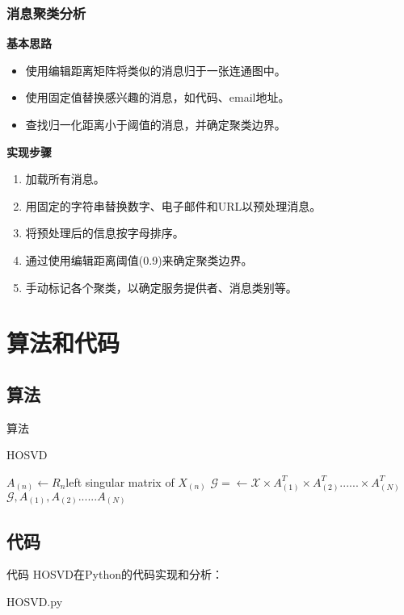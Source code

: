 \documentclass[10pt,aspectratio=43,mathserif,table]{beamer}
\begin{document}
\begin{frame}
\frametitle{消息聚类分析}
\begin{block}{\textbf{基本思路}}
	\begin{itemize}
		\item<0-> 使用编辑距离矩阵将类似的消息归于一张连通图中。
		\item<0-> 使用固定值替换感兴趣的消息，如代码、email地址。
		\item<0-> 查找归一化距离小于阈值的消息，并确定聚类边界。
	\end{itemize}
\end{block}

\begin{block}{\textbf{实现步骤}}
	\begin{enumerate}
		\item<0-> 加载所有消息。
		\item<0-> 用固定的字符串替换数字、电子邮件和URL以预处理消息。
		\item<0-> 将预处理后的信息按字母排序。
		\item<0-> 通过使用编辑距离阈值(0.9)来确定聚类边界。
		\item<0-> 手动标记各个聚类，以确定服务提供者、消息类别等。
	\end{enumerate}
\end{block}
\end{frame}

\section{算法和代码}
\subsection{算法}
\begin{frame}{算法}
\begin{algorithm}[H]
	\caption{HOSVD}
	\small 
	
	{
		$A_{(n)}\leftarrow R_{n}$left singular matrix of $X_{(n)}$
	}
	$\mathcal{G}=\leftarrow \mathcal{X} \times A_{(1)}^{T} \times A_{(2)}^{T}...... \times A_{(N)}^{T}$\\
	\Return $\mathcal{G},A_{(1)},A_{(2)}......A_{(N)} $
\end{algorithm}
\end{frame}

\subsection{代码}
\begin{frame}[fragile]{代码}
HOSVD在Python的代码实现和分析：

{HOSVD.py}
\end{frame}
\end{document}
